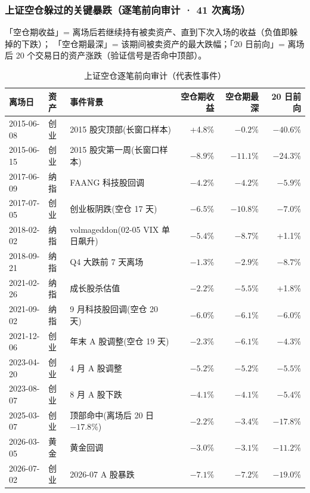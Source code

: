 \documentclass[11pt]{ctexart}
\newcommand{\pos}[1]{\textcolor{poscol}{#1}}   %
\newcommand{\red}[1]{\textcolor{accent}{#1}}   %
\begin{document}
\subsubsection{上证空仓躲过的关键暴跌（逐笔前向审计 · 41 次离场）}

「空仓期收益」= 离场后若继续持有被卖资产、直到下次入场的收益（负值即躲掉的下跌）；
「空仓期最深」= 该期间被卖资产的最大跌幅；「20 日前向」= 离场后 20 个交易日的资产涨跌（验证信号是否命中顶部）。

\begin{table}[htbp]
\centering
\caption{上证空仓逐笔前向审计（代表性事件）}
\small
\begin{tabular}{lllrrr}
\toprule
离场日 & 资产 & 事件背景 & 空仓期收益 & 空仓期最深 & 20 日前向 \\
\midrule
2015-06-08 & 创业 & 2015 股灾顶部(长窗口样本) & \pos{+4.8\%} & $-0.2\%$ & \red{$-40.6\%$} \\
2015-06-15 & 创业 & 2015 股灾第一周(长窗口样本) & \red{$-8.9\%$} & \red{$-11.1\%$} & \red{$-24.3\%$} \\
2017-06-09 & 纳指 & FAANG 科技股回调 & \red{$-4.2\%$} & $-4.2\%$ & \red{$-5.9\%$} \\
2017-07-05 & 创业 & 创业板阴跌(空仓 17 天) & \red{$-6.5\%$} & \red{$-10.8\%$} & \red{$-7.0\%$} \\
2018-02-02 & 纳指 & volmageddon(02-05 VIX 单日飙升) & \red{$-5.4\%$} & \red{$-8.7\%$} & +1.1\% \\
2018-09-21 & 纳指 & Q4 大跌前 7 天离场 & \red{$-1.3\%$} & $-2.9\%$ & \red{$-8.7\%$} \\
2021-02-26 & 纳指 & 成长股杀估值 & \red{$-2.2\%$} & \red{$-5.5\%$} & +1.8\% \\
2021-09-02 & 纳指 & 9 月科技股回调(空仓 20 天) & \red{$-6.0\%$} & \red{$-6.1\%$} & \red{$-6.0\%$} \\
2021-12-06 & 创业 & 年末 A 股调整(空仓 19 天) & \red{$-2.3\%$} & \red{$-6.1\%$} & $-4.3\%$ \\
2023-04-20 & 创业 & 4 月 A 股调整 & \red{$-5.2\%$} & \red{$-5.2\%$} & \red{$-5.5\%$} \\
2023-08-07 & 创业 & 8 月 A 股下跌 & \red{$-4.1\%$} & $-4.1\%$ & \red{$-5.4\%$} \\
2025-03-07 & 创业 & 顶部命中(离场后 20 日 $-17.8\%$) & \red{$-2.2\%$} & $-3.4\%$ & \red{$-17.8\%$} \\
2026-03-05 & 黄金 & 黄金回调 & \red{$-3.0\%$} & $-3.1\%$ & \red{$-11.2\%$} \\
2026-07-02 & 创业 & 2026-07 A 股暴跌 & \red{$-7.1\%$} & \red{$-7.2\%$} & \red{$-19.0\%$} \\
\bottomrule
\end{tabular}
\end{table}
\end{document}
